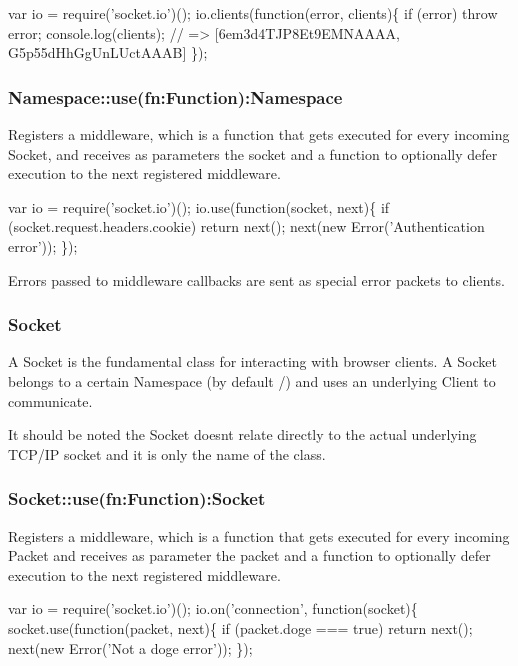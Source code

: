 \begin{DoxyCode}
var io = require('socket.io')();
io.clients(function(error, clients)\{
  if (error) throw error;
  console.log(clients); // => [6em3d4TJP8Et9EMNAAAA, G5p55dHhGgUnLUctAAAB]
\});
\end{DoxyCode}


\subsubsection*{Namespace\+::use(fn\+:\+Function)\+:Namespace}

Registers a middleware, which is a function that gets executed for every incoming {\ttfamily Socket}, and receives as parameters the socket and a function to optionally defer execution to the next registered middleware.


\begin{DoxyCode}
var io = require('socket.io')();
io.use(function(socket, next)\{
  if (socket.request.headers.cookie) return next();
  next(new Error('Authentication error'));
\});
\end{DoxyCode}


Errors passed to middleware callbacks are sent as special {\ttfamily error} packets to clients.

\subsubsection*{Socket}

A {\ttfamily Socket} is the fundamental class for interacting with browser clients. A {\ttfamily Socket} belongs to a certain {\ttfamily Namespace} (by default {\ttfamily /}) and uses an underlying {\ttfamily Client} to communicate.

It should be noted the {\ttfamily Socket} doesn\textquotesingle{}t relate directly to the actual underlying T\+C\+P/\+IP {\ttfamily socket} and it is only the name of the class.

\subsubsection*{Socket\+::use(fn\+:\+Function)\+:Socket}

Registers a middleware, which is a function that gets executed for every incoming {\ttfamily Packet} and receives as parameter the packet and a function to optionally defer execution to the next registered middleware.


\begin{DoxyCode}
var io = require('socket.io')();
io.on('connection', function(socket)\{
  socket.use(function(packet, next)\{
    if (packet.doge === true) return next();
    next(new Error('Not a doge error'));
\});
\end{DoxyCode}


